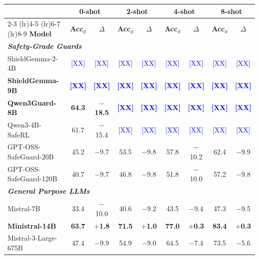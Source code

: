 \begin{table}[t]
\centering
\scriptsize
\begin{tabular}{lcccccccc}
\toprule
 & \multicolumn{2}{c}{\textbf{0-shot}} & \multicolumn{2}{c}{\textbf{2-shot}} & \multicolumn{2}{c}{\textbf{4-shot}} & \multicolumn{2}{c}{\textbf{8-shot}} \\
\cmidrule(lr){2-3} \cmidrule(lr){4-5} \cmidrule(lr){6-7} \cmidrule(lr){8-9}
\textbf{Model} & \textbf{Acc$_d$} & \textbf{$\Delta$} & \textbf{Acc$_d$} & \textbf{$\Delta$} & \textbf{Acc$_d$} & \textbf{$\Delta$} & \textbf{Acc$_d$} & \textbf{$\Delta$} \\
\midrule
\multicolumn{9}{l}{\textbf{\textit{Safety-Grade Guards}}} \\
ShieldGemma-2-4B & \textcolor{blue}{[XX]} & \textcolor{blue}{[XX]} & \textcolor{blue}{[XX]} & \textcolor{blue}{[XX]} & \textcolor{blue}{[XX]} & \textcolor{blue}{[XX]} & \textcolor{blue}{[XX]} & \textcolor{blue}{[XX]} \\
\textbf{ShieldGemma-9B} & \textcolor{blue}{\textbf{[XX]}} & \textcolor{blue}{\textbf{[XX]}} & \textcolor{blue}{\textbf{[XX]}} & \textcolor{blue}{\textbf{[XX]}} & \textcolor{blue}{\textbf{[XX]}} & \textcolor{blue}{\textbf{[XX]}} & \textcolor{blue}{\textbf{[XX]}} & \textcolor{blue}{\textbf{[XX]}} \\
\textbf{Qwen3Guard-8B} & \textbf{64.3} & \textbf{$-$18.5} & \textcolor{blue}{\textbf{[XX]}} & \textcolor{blue}{\textbf{[XX]}} & \textcolor{blue}{\textbf{[XX]}} & \textcolor{blue}{\textbf{[XX]}} & \textcolor{blue}{\textbf{[XX]}} & \textcolor{blue}{\textbf{[XX]}} \\
Qwen3-4B-SafeRL & 61.7 & $-$15.4 & \textcolor{blue}{[XX]} & \textcolor{blue}{[XX]} & \textcolor{blue}{[XX]} & \textcolor{blue}{[XX]} & \textcolor{blue}{[XX]} & \textcolor{blue}{[XX]} \\
GPT-OSS-SafeGuard-20B & 45.2 & $-$9.7 & 53.5 & $-$9.8 & 57.8 & $-$10.2 & 62.4 & $-$9.9 \\
GPT-OSS-SafeGuard-120B & 40.7 & $-$9.7 & 46.8 & $-$9.8 & 51.8 & $-$10.0 & 57.2 & $-$9.8 \\
\midrule[\lightrulewidth]
\multicolumn{9}{l}{\textbf{\textit{General Purpose LLMs}}} \\
Mistral-7B & 33.4 & $-$10.0 & 40.6 & $-$9.2 & 43.5 & $-$9.4 & 47.3 & $-$9.5 \\
\textbf{Ministral-14B} & \textbf{63.7} & \textbf{$+$1.8} & \textbf{71.5} & \textbf{$+$1.0} & \textbf{77.0} & \textbf{$+$0.3} & \textbf{83.4} & \textbf{$+$0.3} \\
Mistral-3-Large-675B & 47.4 & $-$9.9 & 54.9 & $-$9.0 & 64.5 & $-$7.4 & 73.5 & $-$5.6 \\

\end{tabular}
\end{table}
